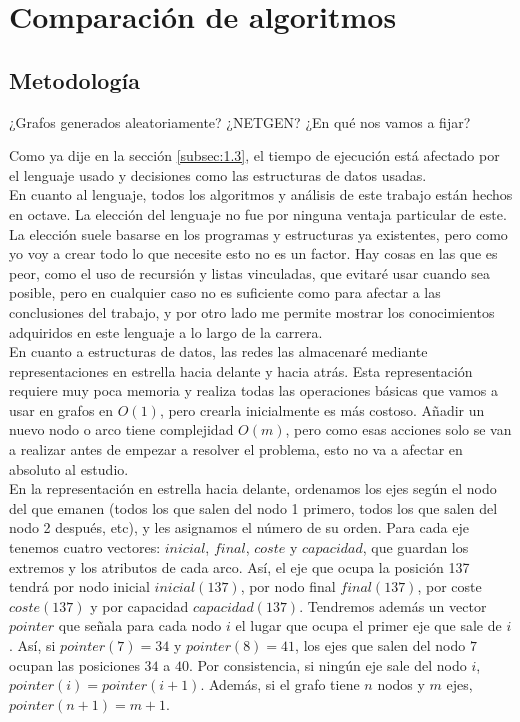 \section{Comparación de algoritmos}


\subsection{Metodología}
¿Grafos generados aleatoriamente? ¿NETGEN? ¿En qué nos vamos a fijar?

Como ya dije en la sección \ref{subsec:1.3}, el tiempo de ejecución está afectado por el lenguaje usado y decisiones como las estructuras de datos usadas.\\

En cuanto al lenguaje, todos los algoritmos y análisis de este trabajo están hechos en octave.
La elección del lenguaje no fue por ninguna ventaja particular de este.
La elección suele basarse en los programas y estructuras ya existentes, pero como yo voy a crear todo lo que necesite esto no es un factor.
Hay cosas en las que es peor, como el uso de recursión y listas vinculadas, que evitaré usar cuando sea posible, pero en cualquier caso no es suficiente como para afectar a las conclusiones del trabajo, y por otro lado me permite mostrar los conocimientos adquiridos en este lenguaje a lo largo de la carrera.\\

En cuanto a estructuras de datos, las redes las almacenaré mediante representaciones en estrella hacia delante y hacia atrás.
Esta representación requiere muy poca memoria y realiza todas las operaciones básicas que vamos a usar en grafos en $O(1)$, pero crearla inicialmente es más costoso.
Añadir un nuevo nodo o arco tiene complejidad $O(m)$, pero como esas acciones solo se van a realizar antes de empezar a resolver el problema, esto no va a afectar en absoluto al estudio.\\

En la representación en estrella hacia delante, ordenamos los ejes según el nodo del que emanen (todos los que salen del nodo 1 primero, todos los que salen del nodo 2 después, etc), y les asignamos el número de su orden.
Para cada eje tenemos cuatro vectores: $inicial$, $final$, $coste$ y $capacidad$, que guardan los extremos y los atributos de cada arco.
Así, el eje que ocupa la posición 137 tendrá por nodo inicial $inicial(137)$, por nodo final $final(137)$, por coste $coste(137)$ y por capacidad $capacidad(137)$.
Tendremos además un vector $pointer$ que señala para cada nodo $i$ el lugar que ocupa el primer eje que sale de $i$.
Así, si $pointer(7)=34$ y $pointer(8)=41$, los ejes que salen del nodo $7$ ocupan las posiciones $34$ a $40$.
Por consistencia, si ningún eje sale del nodo $i$, $pointer(i)=pointer(i+1)$.
Además, si el grafo tiene $n$ nodos y $m$ ejes, $pointer(n+1)=m+1$.\\


